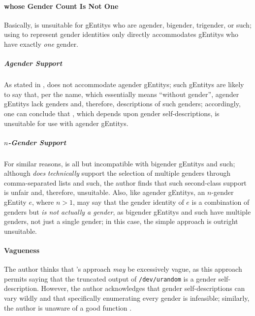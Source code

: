 \documentclass{article}
\begin{document}
\paragraph{ whose Gender Count Is Not One}\label{sec:gender1non1gender}
Basically,  is unsuitable for \glspl{gEntity} who are agender, bigender, trigender, or such; using  to represent gender identities only directly accommodates \glspl{gEntity} who have exactly \emph{one} gender.
\subparagraph{Agender Support}
As stated in ,  does not accommodate agender \glspl{gEntity}; such \glspl{gEntity} are likely to say that,\cite{healthline-agender}\cite{lgbtqia-wiki-agender} per the name, which essentially means ``without gender'',\cite{lgbtqia-wiki-agender} agender \glspl{gEntity} lack genders and, therefore, descriptions of such genders; accordingly, one can conclude that , which depends upon gender self-descriptions, is unsuitable for use with agender \glspl{gEntity}.
\subparagraph{\(n\)-Gender Support}
For similar reasons,  is all but incompatible with bigender \glspl{gEntity} and such; although  \emph{does} \emph{technically} support the selection of multiple genders through comma-separated lists and such, the author finds that such second-class support is unfair and, therefore, unsuitable.  Also, like agender \glspl{gEntity}, an \(n\)-gender \gls{gEntity} \(e\), where \(n > 1\), may say that the gender identity of \(e\) is a combination of genders but \emph{is not actually a gender}, as bigender \glspl{gEntity} and such have multiple genders, not just a single gender;\cite{nonbinaryWikiBigender} in this case, the simple  approach is outright unsuitable.

\paragraph{Vagueness}\label{sec:gender1vagueness}
The author thinks that 's  approach \emph{may} be excessively vague, as this  approach permits saying that the truncated output of \texttt{/dev/urandom} is a gender self-description.  However, the author acknowledges that gender self-descriptions can vary wildly and that specifically enumerating every gender is infeasible; similarly, the author is unaware of a good function  \AgdaSymbol{:}   .
\end{document}
